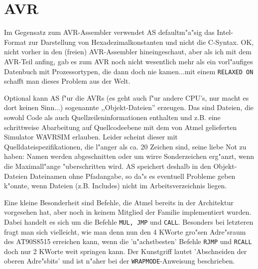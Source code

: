 \documentclass[12pt,a4paper,twoside]{report}
\newcommand{\tty}[1]{{\tt #1}}
\begin{document}

\section{AVR}

Im Gegensatz zum AVR-Assembler verwendet AS defaultm"a"sig das Intel-Format
zur Darstellung von Hexadezimalkonstanten und nicht die C-Syntax.  OK, nicht
vorher in den (freien) AVR-Assembler hineingeschaut, aber als ich mit dem
AVR-Teil anfing, gab es zum AVR noch nicht wesentlich mehr als ein
vorl"aufiges Datenbuch mit Prozessortypen, die dann doch nie kamen...mit
einem \tty{RELAXED ON} schafft man dieses Problem aus der Welt.

Optional kann AS f"ur die AVRs (es geht auch f"ur andere CPU's, nur
macht es dort keinen Sinn...) sogenannte ,,Objekt-Dateien'' erzeugen.
Das sind Dateien, die sowohl Code als auch Quellzeileninformationen
enthalten und z.B. eine schrittweise Abarbeitung auf Quellcodeebene
mit dem von Atmel gelieferten Simulator WAVRSIM erlauben.  Leider
scheint dieser mit Quelldateispezifikationen, die l"anger als ca. 20
Zeichen sind, seine liebe Not zu haben: Namen werden abgeschnitten
oder um wirre Sonderzeichen erg"anzt, wenn die Maximall"ange "uberschritten
wird.  AS speichert deshalb in den Objekt-Dateien Dateinamen ohne
Pfadangabe, so da"s es eventuell Probleme geben k"onnte, wenn
Dateien (z.B. Includes) nicht im Arbeitsverzeichnis liegen.

Eine kleine Besonderheit sind Befehle, die Atmel bereits in der
Architektur vorgesehen hat, aber noch in keinem Mitglied der Familie
implementiert wurden.  Dabei handelt es sich um die Befehle {\tt MUL, JMP}
und {\tt CALL}.  Besonders bei letzteren fragt man sich vielleicht, wie man
denn nun den 4 KWorte gro"sen Adre"sraum des AT90S8515 erreichen kann,
wenn die 'n"achstbesten' Befehle {\tt RJMP} und {\tt RCALL} doch nur 2
KWorte weit springen kann.  Der Kunstgriff lautet 'Abschneiden der oberen
Adre"sbits' und ist n"aher bei der {\tt WRAPMODE}-Anweisung beschrieben.
\end{document}

